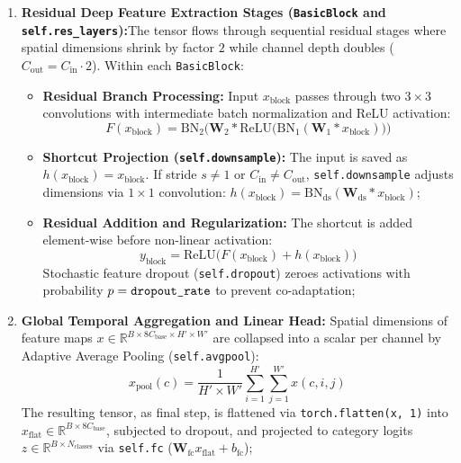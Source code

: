 \begin{enumerate}
\item \textbf{Residual Deep Feature Extraction Stages (\texttt{BasicBlock} and \texttt{self.res\_layers}):}The tensor flows through sequential residual stages where spatial dimensions shrink by factor $2$ while channel depth doubles ($C_{\text{out}} = C_{\text{in}} \cdot 2$). Within each \texttt{BasicBlock}:
\begin{itemize}
    \item \textbf{Residual Branch Processing:} Input $x_{\text{block}}$ passes through two $3 \times 3$ convolutions with intermediate batch normalization and ReLU activation:
    \begin{equation}
        F(x_{\text{block}}) = \text{BN}_2\Big(\mathbf{W}_2 * \text{ReLU}\big(\text{BN}_1(\mathbf{W}_1 * x_{\text{block}})\big)\Big)
    \end{equation}
    
    \item \textbf{Shortcut Projection (\texttt{self.downsample}):} The input is saved as $h(x_{\text{block}}) = x_{\text{block}}$. If stride $s \neq 1$ or $C_{\text{in}} \neq C_{\text{out}}$, \texttt{self.downsample} adjusts dimensions via $1 \times 1$ convolution: $h(x_{\text{block}}) = \text{BN}_{\text{ds}}(\mathbf{W}_{\text{ds}} * x_{\text{block}})$;\\
    
    \item \textbf{Residual Addition and Regularization:} The shortcut is added element-wise before non-linear activation:
    \begin{equation}
        y_{\text{block}} = \text{ReLU}\big(F(x_{\text{block}}) + h(x_{\text{block}})\big)
    \end{equation}
    Stochastic feature dropout (\texttt{self.dropout}) zeroes activations with probability $p = \text{\texttt{dropout\_rate}}$ to prevent co-adaptation;\\
\end{itemize}

\item \textbf{Global Temporal Aggregation and Linear Head:} Spatial dimensions of feature maps $x \in \mathbb{R}^{B \times 8C_{\text{base}} \times H' \times W'}$ are collapsed into a scalar per channel by Adaptive Average Pooling (\texttt{self.avgpool}):
\begin{equation}
    x_{\text{pool}}(c) = \frac{1}{H' \times W'} \sum_{i=1}^{H'} \sum_{j=1}^{W'} x(c, i, j)
\end{equation}
The resulting tensor, as final step, is flattened via \texttt{torch.flatten(x, 1)} into $x_{\text{flat}} \in \mathbb{R}^{B \times 8C_{\text{base}}}$, subjected to dropout, and projected to category logits $z \in \mathbb{R}^{B \times N_{\text{classes}}}$ via \texttt{self.fc} ($\mathbf{W}_{\text{fc}} x_{\text{flat}} + b_{\text{fc}}$);\\


\end{enumerate}
